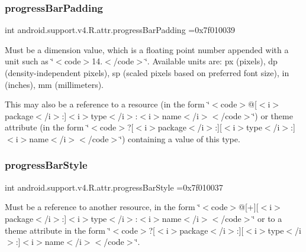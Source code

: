 \subsubsection{\texorpdfstring{progress\+Bar\+Padding}{progressBarPadding}}
{\footnotesize\ttfamily int android.\+support.\+v4.\+R.\+attr.\+progress\+Bar\+Padding =0x7f010039\hspace{0.3cm}{\ttfamily [static]}}

Must be a dimension value, which is a floating point number appended with a unit such as \char`\"{}$<$code$>$14.\+5sp$<$/code$>$\char`\"{}. Available units are\+: px (pixels), dp (density-\/independent pixels), sp (scaled pixels based on preferred font size), in (inches), mm (millimeters). 

This may also be a reference to a resource (in the form \char`\"{}$<$code$>$@\mbox{[}$<$i$>$package$<$/i$>$\+:\mbox{]}$<$i$>$type$<$/i$>$\+:$<$i$>$name$<$/i$>$$<$/code$>$\char`\"{}) or theme attribute (in the form \char`\"{}$<$code$>$?\mbox{[}$<$i$>$package$<$/i$>$\+:\mbox{]}\mbox{[}$<$i$>$type$<$/i$>$\+:\mbox{]}$<$i$>$name$<$/i$>$$<$/code$>$\char`\"{}) containing a value of this type. \mbox{\label{classandroid_1_1support_1_1v4_1_1R_1_1attr_a825836d37f82a837d7db265bcefa17d8}} 
\subsubsection{\texorpdfstring{progress\+Bar\+Style}{progressBarStyle}}
{\footnotesize\ttfamily int android.\+support.\+v4.\+R.\+attr.\+progress\+Bar\+Style =0x7f010037\hspace{0.3cm}{\ttfamily [static]}}

Must be a reference to another resource, in the form \char`\"{}$<$code$>$@\mbox{[}+\mbox{]}\mbox{[}$<$i$>$package$<$/i$>$\+:\mbox{]}$<$i$>$type$<$/i$>$\+:$<$i$>$name$<$/i$>$$<$/code$>$\char`\"{} or to a theme attribute in the form \char`\"{}$<$code$>$?\mbox{[}$<$i$>$package$<$/i$>$\+:\mbox{]}\mbox{[}$<$i$>$type$<$/i$>$\+:\mbox{]}$<$i$>$name$<$/i$>$$<$/code$>$\char`\"{}. \mbox{\label{classandroid_1_1support_1_1v4_1_1R_1_1attr_abb883f55c9e18decf486d36cde924bbd}} 
